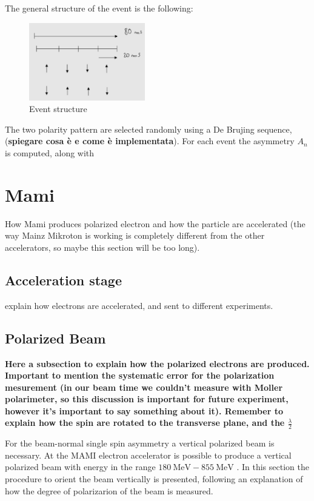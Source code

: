 The general structure of the event is the following: 

\begin{figure}[hbtp]
\centering
\includegraphics[width = 0.45\textwidth]{figures/EventStructure.jpg}
\caption{Event structure}
\end{figure}

The two polarity pattern are selected randomly using a De Brujing sequence, (\textbf{spiegare cosa è e come è implementata}). For each event the asymmetry $A_{n}$ is computed, along with 

\newpage
\section{Mami}
How Mami produces polarized electron and how the particle are accelerated (the way Mainz Mikroton is working is completely different from the other accelerators, so maybe this section will be too long).

\subsection{Acceleration stage}
explain how electrons are accelerated, and sent to different experiments.

\subsection{Polarized Beam}
{\bfseries Here a subsection to explain how the polarized electrons are produced. Important to mention the systematic error for the polarization mesurement (in our beam time we couldn't measure with Moller polarimeter, so this discussion is important for future experiment, however it's important to say something about it). Remember to explain how the spin are rotated to the transverse plane, and the $\frac{\lambda}{2}$}

For the beam-normal single spin asymmetry a vertical polarized beam is necessary. At the MAMI electron accelerator is possible to produce a vertical polarized beam with energy in the range $\SI{180}{\mega \electronvolt} - \SI{855}{\mega \electronvolt}$ \cite{Schlimme_2017}. In this section the procedure to orient the beam vertically is presented, following an explanation of how the degree of polarizarion of the beam is measured. \medskip

